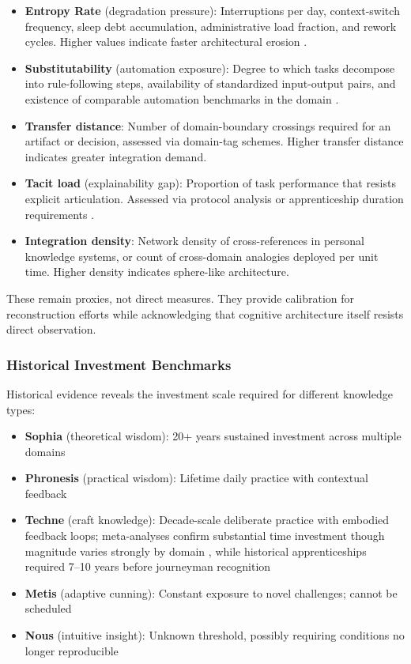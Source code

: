 \begin{itemize}
\item \textbf{Entropy Rate} (degradation pressure): Interruptions per day, context-switch frequency, sleep debt accumulation, administrative load fraction, and rework cycles. Higher values indicate faster architectural erosion \citep{mark2008, gonzalez2004}.

\item \textbf{Substitutability} (automation exposure): Degree to which tasks decompose into rule-following steps, availability of standardized input-output pairs, and existence of comparable automation benchmarks in the domain \citep{frey2017, autor2015}.

\item \textbf{Transfer distance}: Number of domain-boundary crossings required for an artifact or decision, assessed via domain-tag schemes. Higher transfer distance indicates greater integration demand.

\item \textbf{Tacit load} (explainability gap): Proportion of task performance that resists explicit articulation. Assessed via protocol analysis or apprenticeship duration requirements \citep{collins2010}.

\item \textbf{Integration density}: Network density of cross-references in personal knowledge systems, or count of cross-domain analogies deployed per unit time. Higher density indicates sphere-like architecture.
\end{itemize}

These remain proxies, not direct measures. They provide calibration for reconstruction efforts while acknowledging that cognitive architecture itself resists direct observation.

\subsubsection{Historical Investment Benchmarks}

Historical evidence reveals the investment scale required for different knowledge types:
\begin{itemize}
\item \textbf{Sophia} (theoretical wisdom): 20+ years sustained investment across multiple domains
\item \textbf{Phronesis} (practical wisdom): Lifetime daily practice with contextual feedback
\item \textbf{Techne} (craft knowledge): Decade-scale deliberate practice with embodied feedback loops; meta-analyses confirm substantial time investment though magnitude varies strongly by domain \citep{macnamara2014}, while historical apprenticeships required 7--10 years before journeyman recognition \citep{delacroix2018}
\item \textbf{Metis} (adaptive cunning): Constant exposure to novel challenges; cannot be scheduled
\item \textbf{Nous} (intuitive insight): Unknown threshold, possibly requiring conditions no longer reproducible
\end{itemize}

